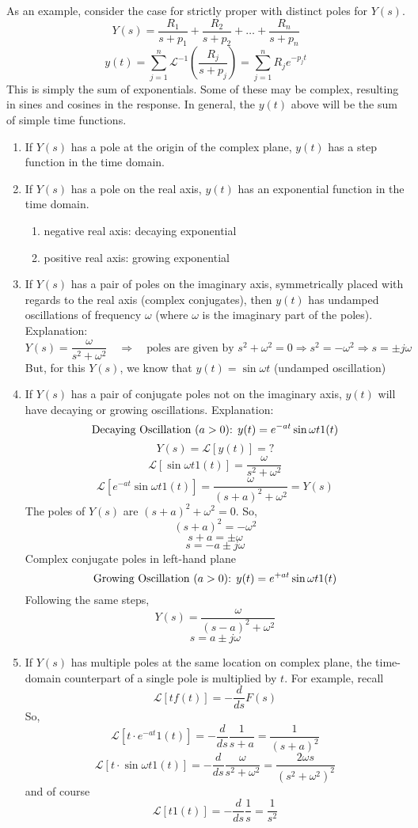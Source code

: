 \documentclass{book}
\newcommand{\LT}{\mathcal{L}}
\newcommand{\jw}{j\omega}
\newcommand{\wt}{\omega t}
\begin{document}
As an example, consider the case for strictly proper with distinct poles for $Y(s) $.
\[ Y(s) = \frac{R_1}{s+p_1}+\frac{R_2}{s+p_2}+\ldots+\frac{R_n}{s+p_n} \]
\[ y(t) = \sum_{j=1}^{n} \LT^{-1} \left(\frac{R_j}{s+p_j}\right) = \sum_{j=1}^{n} R_j e^{-p_jt} \]
This is simply the sum of exponentials. Some of these may be complex, resulting in sines and cosines in the response. In general, the $ y(t) $ above will be the sum of simple time functions.
\begin{enumerate}
	\item If $ Y(s) $ has a pole at the origin of the complex plane, $ y(t) $ has a step function in the time domain.
	\item If $ Y(s) $ has a pole on the real axis, $ y(t) $ has an exponential function in the time domain.
	\begin{enumerate}
		\item negative real axis: decaying exponential
		\item positive real axis: growing exponential
	\end{enumerate}
	\item If $ Y(s) $ has a pair of poles on the imaginary axis, symmetrically placed with regards to the real axis (complex conjugates), then $ y(t) $ has undamped oscillations of frequency $ \omega $ (where $ \omega $ is the imaginary part of the poles). Explanation:
	\[ Y(s) = \frac{\omega}{s^2+\omega^2}  \quad\Rightarrow\quad \text{poles are given by }s^2+\omega^2=0 \Rightarrow s^2=-\omega^2 \Rightarrow s=\pm\jw \]
	But, for this $ Y(s) $, we know that $ y(t)=\sin\wt$ (undamped oscillation)
	\item If $ Y(s) $ has a pair of conjugate poles not on the imaginary axis, $ y(t) $ will have decaying or growing oscillations. Explanation:
	\[ \text{Decaying Oscillation ($ a>0 $): } y(t) = e^{-at}\sin\wt 1(t) \]
	\[ Y(s) = \LT[y(t)] = ? \]
	\[ \LT[\sin\wt 1(t)] = \frac{\omega}{s^2+\omega^2} \]
	\[ \LT[e^{-at}\sin\wt 1(t)] = \frac{\omega}{(s+a)^2+\omega^2} = Y(s) \]
	The poles of $ Y(s) $ are $ (s+a)^2+\omega^2=0 $. So,
	\[ (s+a)^2 = -\omega^2 \]
	\[ s+a = \pm \omega \]
	\[ s= -a\pm\jw \]
	Complex conjugate poles in left-hand plane
	\[ \text{Growing Oscillation ($ a>0 $): } y(t) = e^{+at}\sin\wt 1(t) \]
	Following the same steps,
	\[ Y(s) = \frac{\omega}{(s-a)^2+\omega^2} \]
	\[ s= a\pm\jw \]
	\item If $ Y(s) $ has multiple poles at the same location on complex plane, the time-domain counterpart of a single pole is multiplied by $ t $. For example, recall
	\[ \LT[tf(t)] = -\frac{d}{ds}F(s) \]
	So,
	\[ \LT[t\cdot e^{-at}1(t)] = -\frac{d}{ds}\frac{1}{s+a}=\frac{1}{(s+a)^2} \]
	\[ \LT[t\cdot \sin\wt 1(t)] = -\frac{d}{ds}\frac{\omega}{s^2+\omega^2}=\frac{2\omega s}{(s^2+\omega^2)^2} \]
	and of course
	\[ \LT[t1(t)] = -\frac{d}{ds}\frac{1}{s}=\frac{1}{s^2} \]
\end{enumerate}
\end{document}
